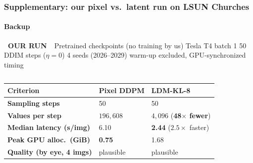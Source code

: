 \documentclass[aspectratio=169,9pt,xcolor=table]{beamer}
\newcommand{\pill}[2]{{\setlength{\fboxsep}{1.2pt}\colorbox{#1}{\color{white}\fontsize{6}{7}\selectfont\bfseries\ #2\ }}}
\newcommand{\ours}{\pill{rev}{OUR RUN}}
\begin{document}
\begin{frame}
\frametitle{Supplementary: our pixel vs.\ latent run on LSUN Churches}
\framesubtitle{Backup}
{\footnotesize \ours\ Pretrained checkpoints (no training by us) \textperiodcentered{} Tesla T4 \textperiodcentered{} batch 1 \textperiodcentered{} 50 DDIM steps ($\eta=0$) \textperiodcentered{} 4 seeds (2026--2029) \textperiodcentered{} warm-up excluded, GPU-synchronized timing\par}
\vspace{1mm}
\begin{columns}[T,onlytextwidth]
{\footnotesize
\renewcommand{\arraystretch}{1.15}
\begin{tabularx}{\linewidth}{@{}>{\bfseries}p{2.65cm}p{1.45cm}Y@{}}
\toprule
{}Criterion & Pixel DDPM & LDM-KL-8\\
\midrule
Sampling steps & 50 & 50\\
Values per step & $196{,}608$ & $4{,}096$ (\textbf{48$\times$ fewer})\\
Median latency (s/img) & 6.10 & \textbf{2.44} ($2.5\times$ faster)\\
Peak GPU alloc.\ (GiB) & \textbf{0.75} & 1.68\\
Quality (by eye, 4 imgs) & plausible & plausible\\
\bottomrule
\end{tabularx}}
\vspace{1.5mm}


\end{columns}
\end{frame}
\end{document}
